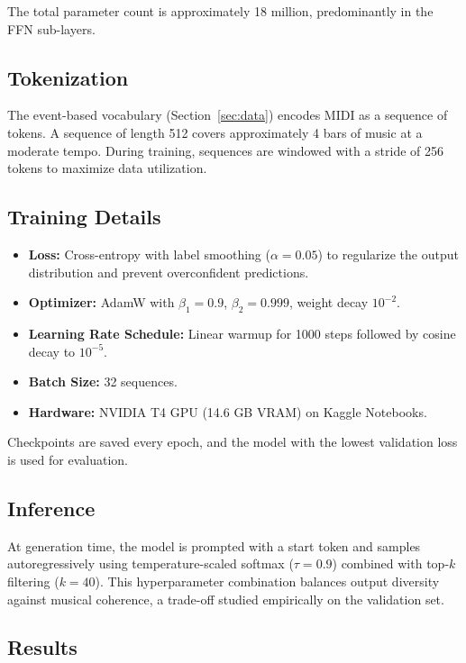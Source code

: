 \documentclass{article}
\begin{document}
The total parameter count is approximately 18 million, predominantly in the FFN sub-layers.

\subsection{Tokenization}

The event-based vocabulary (Section~\ref{sec:data}) encodes MIDI as a sequence of tokens. A sequence of length 512 covers approximately 4 bars of music at a moderate tempo. During training, sequences are windowed with a stride of 256 tokens to maximize data utilization.

\subsection{Training Details}

\begin{itemize}
  \item \textbf{Loss:} Cross-entropy with label smoothing ($\alpha = 0.05$) to regularize the output distribution and prevent overconfident predictions.
  \item \textbf{Optimizer:} AdamW with $\beta_1 = 0.9$, $\beta_2 = 0.999$, weight decay $10^{-2}$.
  \item \textbf{Learning Rate Schedule:} Linear warmup for 1000 steps followed by cosine decay to $10^{-5}$.
  \item \textbf{Batch Size:} 32 sequences.
  \item \textbf{Hardware:} NVIDIA T4 GPU (14.6 GB VRAM) on Kaggle Notebooks.
\end{itemize}

Checkpoints are saved every epoch, and the model with the lowest validation loss is used for evaluation.

\subsection{Inference}

At generation time, the model is prompted with a start token and samples autoregressively using temperature-scaled softmax ($\tau = 0.9$) combined with top-$k$ filtering ($k = 40$). This hyperparameter combination balances output diversity against musical coherence, a trade-off studied empirically on the validation set.

\subsection{Results}
\end{document}

